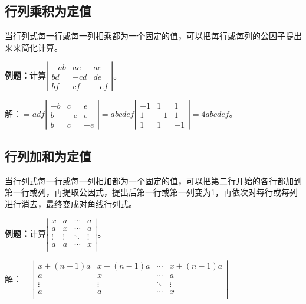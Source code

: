\subsection{行列乘积为定值}

当行列式每一行或每一列相乘都为一个固定的值，可以把每行或每列的公因子提出来来简化计算。

\textbf{例题：}计算$\left|\begin{array}{ccc} 
    -ab & ac & ae \\
    bd & -cd & de \\
    bf & cf & -ef
\end{array}\right|$。

解：$=adf\left|\begin{array}{ccc} 
    -b & c & e \\
    b & -c & e \\
    b & c & -e
\end{array}\right|
=abcdef\left|\begin{array}{ccc} 
    -1 & 1 & 1 \\
    1 & -1 & 1 \\
    1 & 1 & -1
\end{array}\right|=4abcdef$。

\subsection{行列加和为定值}

当行列式每一行或每一列相加都为一个固定的值，可以把第二行开始的各行都加到第一行或列，再提取公因式，提出后第一行或第一列变为1，再依次对每行或每列进行消去，最终变成对角线行列式。

\textbf{例题：}计算$\left|\begin{array}{cccc} 
    x & a & \cdots & a \\
    a & x & \cdots & a \\
    \vdots & \vdots & \ddots & \vdots \\
    a & a & \cdots & x \\
\end{array}\right|$。

解：$=\left|\begin{array}{cccc} 
    x+(n-1)a & x+(n-1)a & \cdots & x+(n-1)a \\
    a & x & \cdots & a \\
    \vdots & \vdots & \ddots & \vdots \\
    a & a & \cdots & x \\
\end{array}\right|$

